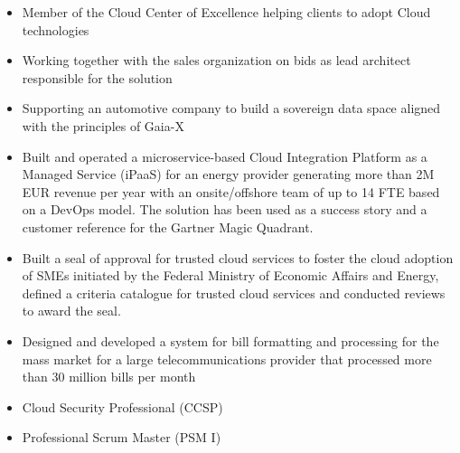 \documentclass[10pt,a4paper,ragged2e,withhyper]{altacv}
\begin{document}
\begin{paracol}{2}

\begin{itemize}
\item Member of the Cloud Center of Excellence helping clients to adopt Cloud technologies
\item Working together with the sales organization on bids as lead architect responsible for the solution
\item Supporting an automotive company to build a sovereign data space aligned with the principles of Gaia-X
\item Built and operated a microservice-based Cloud Integration Platform as a Managed Service (iPaaS) for an energy provider generating more than 2M EUR revenue per year with an onsite/offshore team of up to 14 FTE based on a DevOps model. The solution has been used as a success story and a customer reference for the Gartner Magic Quadrant.
\item Built a seal of approval for trusted cloud services to foster the cloud adoption of SMEs initiated by the Federal Ministry of Economic Affairs and Energy, defined a criteria catalogue for trusted cloud services and conducted reviews to award the seal.
\end{itemize}

\divider

\begin{itemize}
\item Designed and developed a system for bill formatting and processing for the mass market for a large telecommunications provider that processed more than 30 million bills per month
\end{itemize}


\begin{itemize}
\item Cloud Security Professional (CCSP)
\item Professional Scrum Master (PSM I)
\end{itemize}

\medskip




\end{paracol}
\end{document}
